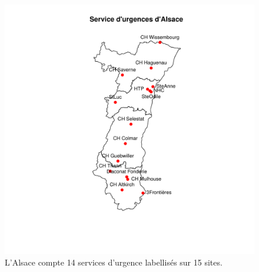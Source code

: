 \documentclass[12pt,english,french,twoside]{book}\usepackage[]{graphicx}\usepackage[]{color}
\makeatletter
\def\maxwidth{ %
  \ifdim\Gin@nat@width>\linewidth
    \linewidth
  \else
    \Gin@nat@width
  \fi
}
\newenvironment{kframe}{%
 \def\at@end@of@kframe{}%
 \ifinner\ifhmode%
  \def\at@end@of@kframe{\end{minipage}}%
  \begin{minipage}{\columnwidth}%
 \fi\fi%
 \def\FrameCommand##1{\hskip\@totalleftmargin \hskip-\fboxsep
 \colorbox{shadecolor}{##1}\hskip-\fboxsep
     \hskip-\linewidth \hskip-\@totalleftmargin \hskip\columnwidth}%
 \MakeFramed {\advance\hsize-\width
   \@totalleftmargin\z@ \linewidth\hsize
   \@setminipage}}%
 {\par\unskip\endMakeFramed%
 \at@end@of@kframe}
\newenvironment{knitrout}{}{} %
\makeatother
\begin{document}
\begin{figure}[ht]
 \centering
\begin{knitrout}
\color{fgcolor}\begin{kframe}


{\ttfamily\noindent\bfseries\color{errorcolor}{\#\# Error: valeur 'pos' incorrecte}}\end{kframe}
\includegraphics[width=\maxwidth]{figure/carte_sau_2} 

\end{knitrout}

 \caption[Services d'urgence d'Alsace]{L'Alsace compte 14 services d'urgence labellisés sur 15 sites.}
 \label{fig:su_alsace}
\end{figure}
\end{document}
